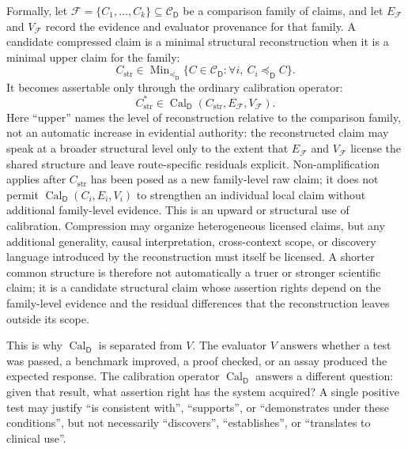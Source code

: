 \documentclass[11pt,a4paper]{article}
\newcommand{\Cal}{\operatorname{Cal}}
\newcommand{\Dom}{\mathsf{D}}
\begin{document}
Formally, let $\mathcal{F}=\{C_1,\ldots,C_k\}\subseteq\mathcal{C}_{\Dom}$ be a comparison family of claims, and let $E_{\mathcal{F}}$ and $V_{\mathcal{F}}$ record the evidence and evaluator provenance for that family. A candidate compressed claim is a minimal structural reconstruction when it is a minimal upper claim for the family:
\begin{equation}
C_{\mathrm{str}}\in
\operatorname{Min}_{\preceq_{\Dom}}
\{C\in\mathcal{C}_{\Dom}:\forall i,\ C_i\preceq_{\Dom} C\}.
\end{equation}
It becomes assertable only through the ordinary calibration operator:
\begin{equation}
C_{\mathrm{str}}^\ast\in
\Cal_{\Dom}(C_{\mathrm{str}},E_{\mathcal{F}},V_{\mathcal{F}}).
\end{equation}
Here ``upper'' names the level of reconstruction relative to the comparison family, not an automatic increase in evidential authority: the reconstructed claim may speak at a broader structural level only to the extent that $E_{\mathcal{F}}$ and $V_{\mathcal{F}}$ license the shared structure and leave route-specific residuals explicit. Non-amplification applies after $C_{\mathrm{str}}$ has been posed as a new family-level raw claim; it does not permit $\Cal_{\Dom}(C_i,E_i,V_i)$ to strengthen an individual local claim without additional family-level evidence. This is an upward or structural use of calibration. Compression may organize heterogeneous licensed claims, but any additional generality, causal interpretation, cross-context scope, or discovery language introduced by the reconstruction must itself be licensed. A shorter common structure is therefore not automatically a truer or stronger scientific claim; it is a candidate structural claim whose assertion rights depend on the family-level evidence and the residual differences that the reconstruction leaves outside its scope.

This is why $\Cal_{\Dom}$ is separated from $V$. The evaluator $V$ answers whether a test was passed, a benchmark improved, a proof checked, or an assay produced the expected response. The calibration operator $\Cal_{\Dom}$ answers a different question: given that result, what assertion right has the system acquired? A single positive test may justify ``is consistent with'', ``supports'', or ``demonstrates under these conditions'', but not necessarily ``discovers'', ``establishes'', or ``translates to clinical use''.
\end{document}

